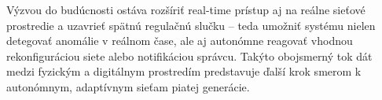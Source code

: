 Výzvou do budúcnosti ostáva rozšíriť real-time prístup aj na reálne sieťové prostredie a uzavrieť spätnú regulačnú slučku – teda umožniť systému nielen detegovať anomálie v reálnom čase, ale aj autonómne reagovať vhodnou rekonfiguráciou siete alebo notifikáciou správcu. Takýto obojsmerný tok dát medzi fyzickým a digitálnym prostredím predstavuje ďalší krok smerom k autonómnym, adaptívnym sieťam piatej generácie.